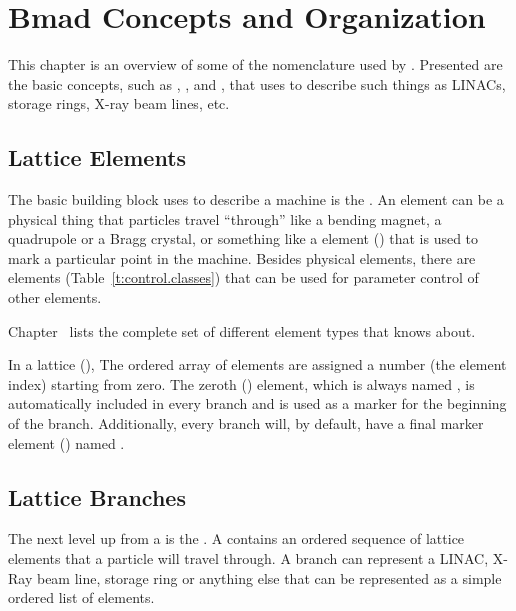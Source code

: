 \chapter{Bmad Concepts and Organization}
\label{c:lat.concepts}

This chapter is an overview of some of the nomenclature used by \bmad. Presented are the basic
concepts, such as , , and , that \bmad uses to describe such
things as LINACs, storage rings, X-ray beam lines, etc.

\section{Lattice Elements}
\label{s:element.def}

The basic building block \bmad uses to describe a machine is the  . An
element can be a physical thing that particles travel ``through'' like a bending magnet, a
quadrupole or a Bragg crystal, or something like a  element () that is used
to mark a particular point in the machine.  Besides physical elements, there are 
elements (Table~\ref{t:control.classes}) that can be used for parameter control of other elements.

Chapter~ lists the complete set of different element types that \bmad knows about.

In a lattice  (), The ordered array of elements are assigned a number
(the element index) starting from zero. The zeroth  () element,
which is always named , is automatically included in every branch and is used as a
marker for the beginning of the branch.  Additionally, every branch will, by default, have a final
marker element () named .

\section{Lattice Branches}
\label{s:branch.def}

The next level up from a   is the  . A 
 contains an ordered sequence of lattice elements that a particle will travel through. A
branch can represent a LINAC, X-Ray beam line, storage ring or anything else that can be represented
as a simple ordered list of elements.

